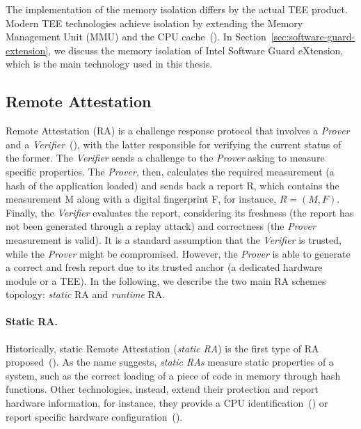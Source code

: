 The implementation of the memory isolation differs by the actual TEE product.
Modern TEE technologies achieve isolation by extending the Memory Management 
Unit (MMU) and the CPU 
cache~(\cite{winter2008trusted,gilmont1999enhancing,rozas2013intel}).
In Section~\ref{sec:software-guard-extension}, we discuss the memory isolation 
of Intel Software Guard eXtension, which is the main technology 
used in this thesis.
                 

\subsection{Remote Attestation}
\label{ssec:remote-attestation}

Remote Attestation (RA) is a challenge response protocol that involves a 
\emph{Prover} and a \emph{Verifier}~(\cite{bajikar2002trusted}), with the 
latter responsible for verifying the current status of the former. 
The \emph{Verifier} sends a challenge to the \emph{Prover} asking to 
measure specific properties. The \emph{Prover}, then, calculates the required 
measurement (\eg a hash of the application loaded) and sends back a report R, 
which contains the measurement M along with a digital fingerprint F, for 
instance, $R = (M,F)$. Finally, the \emph{Verifier} evaluates the report, 
considering its freshness (\ie the report has not been generated through a 
replay attack) and correctness (\ie the \emph{Prover} measurement is valid). It 
is a standard assumption that the \emph{Verifier} is trusted, while the 
\emph{Prover} 
might be compromised. However, the \emph{Prover} is able to generate a correct 
and fresh report due to its trusted anchor (\eg a dedicated hardware module or 
a TEE).
In the following, we describe the two main RA schemes topology: 
\emph{static} RA and \emph{runtime} RA.

\paragraph{Static RA.}
Historically, static Remote Attestation (\emph{static RA}) is the first type of 
RA proposed~(\cite{bajikar2002trusted}).
As the name suggests, \emph{static RAs} measure static properties of a system, 
such as the correct loading of a piece of code in memory through hash functions.
Other technologies, instead, extend their protection and report hardware 
information, for instance, they provide a CPU 
identification~(\cite{anati2013innovative}) or report specific hardware 
configuration~(\cite{sailer2004design}).

